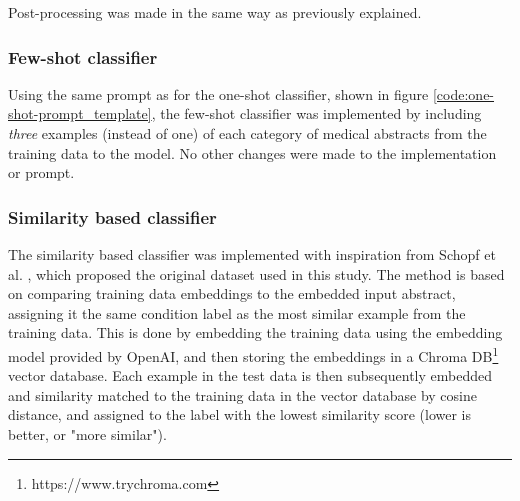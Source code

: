 Post-processing was made in the same way as previously explained. 

\subsubsection{Few-shot classifier}

Using the same prompt as for the one-shot classifier, shown in figure \ref{code:one-shot-prompt_template}, the few-shot classifier was implemented by including \textit{three} examples (instead of one) of each category of medical abstracts from the training data to the model. No other changes were made to the implementation or prompt.

\subsubsection{Similarity based classifier}

The similarity based classifier was implemented with inspiration from Schopf et al. \cite{Schopf2022EvaluatingApproaches}, which proposed the original dataset used in this study. The method is based on comparing training data embeddings to the embedded input abstract, assigning it the same condition label as the most similar example from the training data. This is done by embedding the training data using the embedding model provided by OpenAI, and then storing the embeddings in a Chroma DB\footnote{https://www.trychroma.com} vector database. Each example in the test data is then subsequently embedded and similarity matched to the training data in the vector database by cosine distance, and assigned to the label with the lowest similarity score (lower is better, or "more similar").